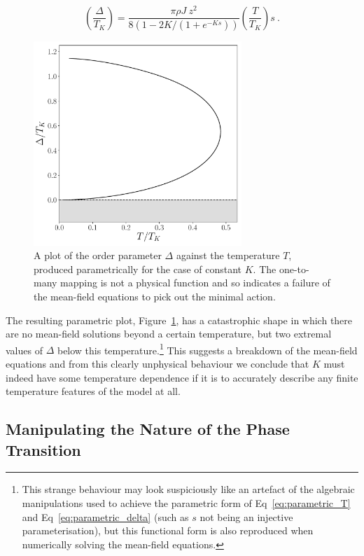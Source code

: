 \begin{equation}
\left( \frac{\Delta}{T_K} \right) = \frac{\pi \rho J ~ z^2}{8 (1 - 2 K / (1 + e^{- K s}))} \left( \frac{T}{T_K} \right) s ~ .
\label{eq:parametric_delta}
\end{equation}

\begin{figure}[ht]
\centering
\includegraphics[width=0.7\textwidth]{Figures/new_delta_vs_T_parametric.pdf}
\caption{A plot of the order parameter $ \Delta $ against the temperature $ T $, produced parametrically for the case of constant $ K $. The one-to-many mapping is not a physical function and so indicates a failure of the mean-field equations to pick out the minimal action.}
\label{fig:parametric}
\end{figure}

The resulting parametric plot, Figure~\ref{fig:parametric}, has a catastrophic shape in which there are no mean-field solutions beyond a certain temperature, but two extremal values of $ \Delta $ below this temperature.\footnote{This strange behaviour may look suspiciously like an artefact of the algebraic manipulations used to achieve the parametric form of Eq~\eqref{eq:parametric_T} and Eq~\eqref{eq:parametric_delta} (such as $ s $ not being an injective parameterisation), but this functional form is also reproduced when numerically solving the mean-field equations.} This suggests a breakdown of the mean-field equations and from this clearly unphysical behaviour we conclude that $ K $ must indeed have some temperature dependence if it is to accurately describe any finite temperature features of the model at all.

\subsection{Manipulating the Nature of the Phase Transition}
\label{subsec:manipulating_PT}

